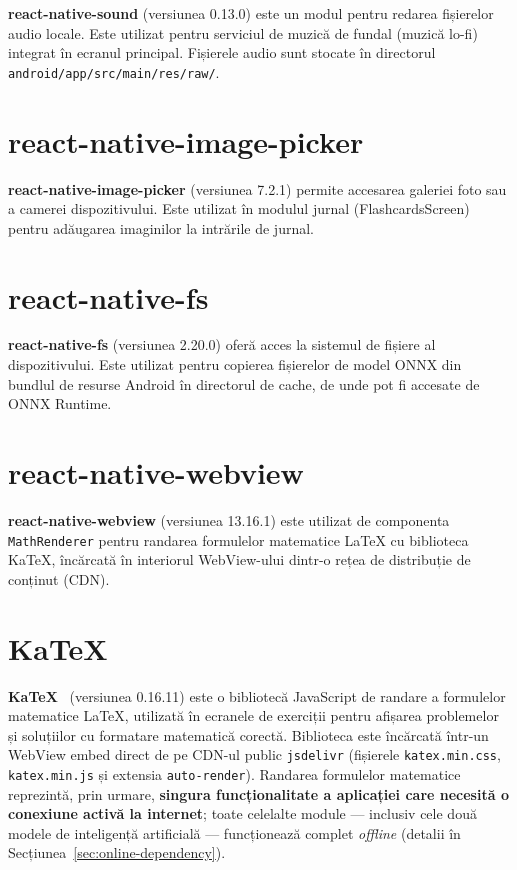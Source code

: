 \documentclass[12pt, a4paper, twoside]{report}
\numberwithin{equation}{section}
\begin{document}
\textbf{react-native-sound} (versiunea 0.13.0) este un modul pentru redarea fișierelor
audio locale. Este utilizat pentru serviciul de muzică de fundal (muzică lo-fi) integrat
în ecranul principal. Fișierele audio sunt stocate în directorul
\texttt{android/app/src/main/res/raw/}.

\section{react-native-image-picker}

\textbf{react-native-image-picker} (versiunea 7.2.1) permite accesarea galeriei foto
sau a camerei dispozitivului. Este utilizat în modulul jurnal (FlashcardsScreen) pentru
adăugarea imaginilor la intrările de jurnal.

\section{react-native-fs}

\textbf{react-native-fs} (versiunea 2.20.0) oferă acces la sistemul de fișiere al
dispozitivului. Este utilizat pentru copierea fișierelor de model ONNX din bundlul
de resurse Android în directorul de cache, de unde pot fi accesate de ONNX Runtime.

\section{react-native-webview}

\textbf{react-native-webview} (versiunea 13.16.1) este utilizat de componenta
\texttt{MathRenderer} pentru randarea formulelor matematice LaTeX cu biblioteca KaTeX,
încărcată în interiorul WebView-ului dintr-o rețea de distribuție de conținut (CDN).

\section{KaTeX}

\textbf{KaTeX}~\cite{katex} (versiunea 0.16.11) este o bibliotecă JavaScript de randare a formulelor
matematice LaTeX, utilizată în ecranele de exerciții pentru afișarea problemelor și
soluțiilor cu formatare matematică corectă. Biblioteca este încărcată într-un WebView embed
direct de pe CDN-ul public \texttt{jsdelivr} (fișierele \texttt{katex.min.css},
\texttt{katex.min.js} și extensia \texttt{auto-render}). Randarea formulelor matematice
reprezintă, prin urmare, \textbf{singura funcționalitate a aplicației care necesită o
conexiune activă la internet}; toate celelalte module — inclusiv cele două modele de
inteligență artificială — funcționează complet \textit{offline} (detalii în
Secțiunea~\ref{sec:online-dependency}).
\end{document}
